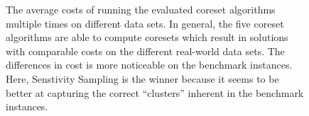 \begin{figure}[H]
{ }
 \newline\newline
 \newline\newline
  \caption{The average costs of running the evaluated coreset algorithms multiple times on different data sets. In general, the five coreset algorithms are able to compute coresets which result in solutions with comparable costs on the different real-world data sets. The differences in cost is more noticeable on the benchmark instances. Here, Senstivity Sampling is the winner because it seems to be better at capturing the correct ``clusters'' inherent in the benchmark instances.}
 \label{fig:real-costs}
\end{figure}
